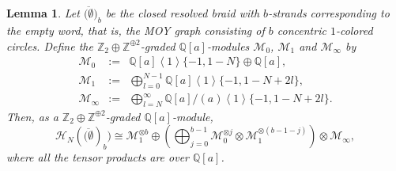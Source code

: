 \documentclass{amsart}
\theoremstyle{plain}
\newtheorem{lemma}[theorem]{Lemma}
\theoremstyle{definition}
\theoremstyle{remark}
\numberwithin{equation}{section}
\begin{document}
\begin{lemma}\label{lemma-homology-empty-braid}
Let $\overline{(\emptyset})_b$ be the closed resolved braid with $b$-strands corresponding to the empty word, that is, the MOY graph consisting of $b$ concentric $1$-colored circles. Define the ${\mathbb{Z}}_2 \oplus {\mathbb{Z}}^{\oplus 2}$-graded ${\mathbb{Q}}[a]$-modules $\mathcal{M}_0$, $\mathcal{M}_1$ and $\mathcal{M}_\infty$ by
\begin{eqnarray*}
\mathcal{M}_0 & := & {\mathbb{Q}}[a] \left\langle 1 \right\rangle \{-1, 1-N\} \oplus {\mathbb{Q}}[a], \\
\mathcal{M}_1 & := & \bigoplus_{l=0}^{N-1} {\mathbb{Q}}[a] \left\langle 1 \right\rangle \{-1, 1-N+2l\}, \\
\mathcal{M}_\infty & := & \bigoplus_{l=N}^{\infty} {\mathbb{Q}}[a]/(a) \left\langle 1 \right\rangle \{-1, 1-N+2l\}.
\end{eqnarray*}
Then, as a ${\mathbb{Z}}_2 \oplus {\mathbb{Z}}^{\oplus 2}$-graded ${\mathbb{Q}}[a]$-module,
\[
{\mathcal{H}}_N(\overline{(\emptyset})_b) \cong \mathcal{M}_1 ^{\otimes b} \oplus \left( \bigoplus_{j=0}^{b-1} \mathcal{M}_0^{\otimes j} \otimes \mathcal{M}_1^{\otimes (b-1-j)} \right) \otimes \mathcal{M}_\infty,
\]
where all the tensor products are over ${\mathbb{Q}}[a]$.
\end{lemma}
\end{document}
